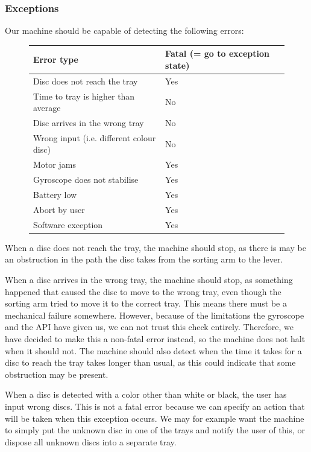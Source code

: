 \documentclass[a4paper,oneside,11pt]{article}
\begin{document}
\subsubsection{Exceptions}
Our machine should be capable of detecting the following errors:
\begin{figure}[H]
\centering
\begin{tabular}{|l|l|}
\hline
Error type & Fatal (= go to exception state)\\\hline
Disc does not reach the tray & Yes\\\hline
Time to tray is higher than average & No\\\hline
Disc arrives in the wrong tray & No\\\hline
Wrong input (i.e. different colour disc) & No\\\hline
Motor jams & Yes \\\hline
Gyroscope does not stabilise & Yes \\\hline
Battery low & Yes \\\hline
Abort by user & Yes \\\hline
Software exception & Yes \\\hline
\end{tabular}
\end{figure}
When a disc does not reach the tray, the machine should stop, as there is may be an obstruction in the path the disc takes from the sorting arm to the lever.

When a disc arrives in the wrong tray, the machine should stop, as something happened that caused the disc to move to the wrong tray, even though the sorting arm tried to move it to the correct tray. This means there must be a mechanical failure somewhere. However, because of the limitations the gyroscope and the API have given us, we can not trust this check entirely. Therefore, we have decided to make this a non-fatal error instead, so the machine does not halt when it should not. The machine should also detect when the time it takes for a disc to reach the tray takes longer than usual, as this could indicate that some obstruction may be present.

When a disc is detected with a color other than white
or black, the user has input wrong discs. This is not a fatal error because
we can specify an action that will be taken when this exception occurs. We may for example
want the machine to simply put the unknown disc in one of the trays and notify the user of this, or dispose all unknown discs into a separate tray.
\end{document}
